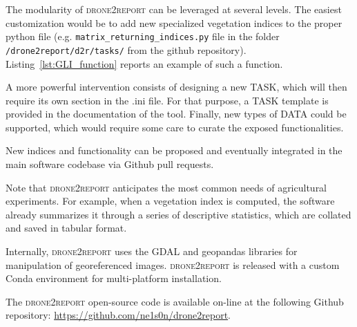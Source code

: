 \documentclass[drones,technicalnote,accept,pdftex,moreauthors]{Definitions/mdpi}
\begin{document}
The modularity of \textsc{drone2report} can be leveraged at several levels. The easiest customization would be to add new specialized vegetation indices to the proper python file (e.g. \verb|matrix_returning_indices.py| file in the folder \verb|/drone2report/d2r/tasks/| from the github repository). Listing~\ref{lst:GLI_function} reports an example of such a function.

A more powerful intervention consists of designing a new TASK, which will then require its own section in the .ini file. For that purpose, a TASK template is provided in the documentation of the tool. Finally, new types of DATA could be supported, which would require some care to curate the exposed functionalities.

New indices and functionality can be proposed and eventually integrated in the main software codebase via Github pull requests.

Note that \textsc{drone2report} anticipates the most common needs of agricultural experiments. For example, when a vegetation index is computed, the software already summarizes it through a series of descriptive statistics, which are collated and saved in tabular format.

Internally, \textsc{drone2report} uses the GDAL \cite{GDALmanual} and geopandas \cite{kelsey_jordahl_2020_3946761} libraries for manipulation of georeferenced images. \textsc{drone2report} is released with a custom Conda environment for multi-platform installation.

The \textsc{drone2report} open-source code is available on-line at the following Github repository: \url{https://github.com/ne1s0n/drone2report}.
\end{document}
